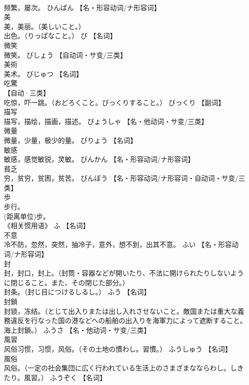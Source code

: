 \documentclass[8pt]{extreport}
\begin{document}
\begin{CJK}{UTF8}{min}
\\	频繁，屡次。	ひんぱん		【名・形容动词/ナ形容词】
\\	美	
\\	美，美丽。（美しいこと。） 
\\	出色。（りっぱなこと。）	び		【名词】
\\	微笑	
\\	微笑。	びしょう		【自动词・サ变/三类】
\\	美術	
\\	美术。	びじゅつ		【名词】
\\	吃驚	
\\	【自动·三类】 
\\	吃惊，吓一跳。（おどろくこと。びっくりすること。）	びっくり		【副词】
\\	描写	
\\	描写，描绘，描画，描述。	びょうしゃ		【名・他动词・サ变/三类】
\\	微量	
\\	微量，少量，极少的量。	びりょう		【名词】
\\	敏感	
\\	敏感，感觉敏锐，灵敏。	びんかん		【名・形容动词/ナ形容词】
\\	貧乏	
\\	穷，贫穷，贫困，贫苦。	びんぼう		【名・形容动词/ナ形容词・自动词・サ变/三类】
\\	歩	
\\	步行。 
\\	(距离单位)步。 
\\	《相关惯用语》	ふ		【名词】
\\	不意	
\\	冷不防，忽然，突然，抽冷子，意外，想不到，出其不意。	ふい		【名・形容动词/ナ形容词】
\\	封	
\\	封，封口，封上。（封筒・容器などが開いたり、不法に開けられたりしないように閉じること。また、その閉じた部分。） 
\\	封条。（封じ目につけるしるし。）	ふう		【名词】
\\	封鎖	
\\	封锁，冻结。（とじて出入りまたは出し入れさせないこと。敵国または重大な義務違反を行なった国の港などへの船舶の出入りを海軍力によって遮断すること。海上封鎖。）	ふうさ		【名・他动词・サ变/三类】
\\	風習	
\\	风俗习惯，习惯，风俗。（その土地の慣わし。習慣。）	ふうしゅう		【名词】
\\	風俗	
\\	风俗。（一定の社会集団に広く行われている生活上のさまざまなならわし。しきたり。風習。）	ふうぞく		【名词】

\end{CJK}
\end{document}
